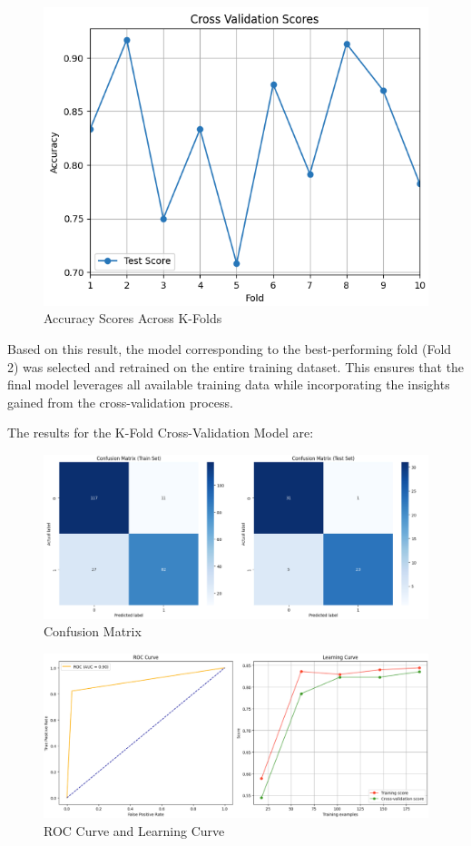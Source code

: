 \begin{figure}[H] \centering \includegraphics[width=0.75\linewidth]{images/k_fold_cross_svc.png} \caption{Accuracy Scores Across K-Folds} \label{fig:k_fold_cross_svc.png} \end{figure}

Based on this result, the model corresponding to the best-performing fold (Fold 2) was selected and retrained on the entire training dataset. This ensures that the final model leverages all available training data while incorporating the insights gained from the cross-validation process.

The results for the K-Fold Cross-Validation Model are:

\begin{figure}[H]
    \centering
    \includegraphics[width=1\linewidth]{images/confusion_matrix_svc_kfold.png}
    \caption{Confusion Matrix}
    \label{fig:enter-label}
\end{figure}
\begin{figure}[H]
    \centering
    \includegraphics[width=1\linewidth]{images/roc_learning_svc_kfold.png}
    \caption{ROC Curve and Learning Curve}%
    \label{fig:enter-label}
\end{figure}

